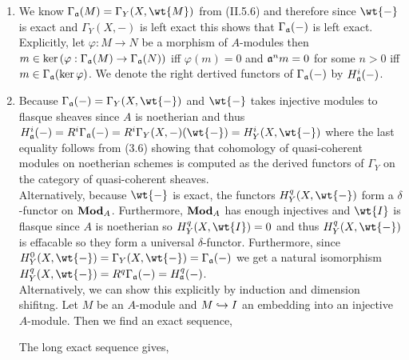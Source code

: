 \documentclass[12pt]{article}
\begin{document}
\begin{enumerate}
\item We know $\Gamma_\a(M) = \Gamma_Y(X, \wt{M})$ from (II.5.6) and therefore since $\wt{-}$ is exact and $\Gamma_Y(X, -)$ is left exact this shows that $\Gamma_{\mathfrak{a}}(-)$ is left exact. Explicitly, let $\varphi : M \to N$ be a morphism of $A$-modules then $m \in \ker{(\varphi : \Gamma_{\mathfrak{a}}(M) \to \Gamma_{\mathfrak{a}}(N))}$ iff $\varphi(m) = 0$ and $\mathfrak{a}^n m = 0$ for some $n > 0$ iff $m \in \Gamma_{\mathfrak{a}}(\ker{\varphi})$. We denote the right dertived functors of $\Gamma_{\mathfrak{a}}(-)$ by $H_{\mathfrak{a}}^i(-)$.

\item Because $\Gamma_\a(-) = \Gamma_Y(X, \wt{-})$ and $\wt{-}$ takes injective modules to flasque sheaves since $A$ is noetherian and thus $H_\a^i(-) = R^i \Gamma_\a(-) = R^i \Gamma_Y(X, -)(\wt{-}) = H_Y^i(X, \wt{-})$ where the last equality follows from (3.6) showing that cohomology of quasi-coherent modules on noetherian schemes is computed as the derived functors of $\Gamma_Y$ on the category of quasi-coherent sheaves. 
\bigskip\\
Alternatively, because $\wt{-}$ is exact, the functors $H^q_Y(X, \wt{-})$ form a $\delta$-functor on $\mathbf{Mod}_{A}$. Furthermore, $\mathbf{Mod}_{A}$ has enough injectives and $\wt{I}$ is flasque since $A$ is noetherian so $H^q_Y(X, \wt{I}) = 0$ and thus $H^q_Y(X, \wt{-})$ is effacable so they form a universal $\delta$-functor. Furthermore, since $H^0_Y(X, \wt{-}) = \Gamma_Y(X, \wt{-}) = \Gamma_\a(-)$ we get a natural isomorphism $H^q_Y(X, \wt{-}) = R^q \Gamma_\a(-) = H^q_\a(-)$.
\bigskip\\
Alternatively, we can show this explicitly by induction and dimension shifitng. Let $M$ be an $A$-module and $M \hookrightarrow I$ an embedding into an injective $A$-module. Then we find an exact sequence,
\begin{center}
\end{center}
The long exact sequence gives,
\begin{center}
\end{center}

\end{enumerate}
\end{document}

